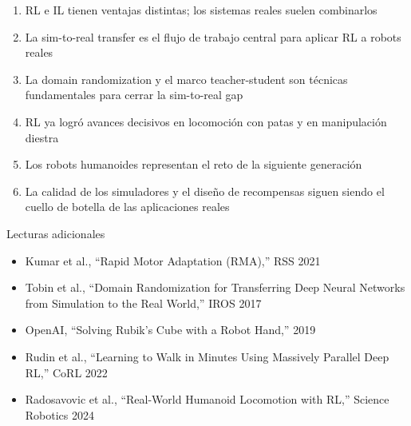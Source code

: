 \documentclass[a4paper]{article}
\begin{document}
\begin{enumerate}
    \item RL e IL tienen ventajas distintas; los sistemas reales suelen combinarlos
    \item La sim-to-real transfer es el flujo de trabajo central para aplicar RL a robots reales
    \item La domain randomization y el marco teacher-student son técnicas fundamentales para cerrar la sim-to-real gap
    \item RL ya logró avances decisivos en locomoción con patas y en manipulación diestra
    \item Los robots humanoides representan el reto de la siguiente generación
    \item La calidad de los simuladores y el diseño de recompensas siguen siendo el cuello de botella de las aplicaciones reales
\end{enumerate}

\begin{knowledgebox}{Lecturas adicionales}
\begin{itemize}
    \item Kumar et al., ``Rapid Motor Adaptation (RMA),'' RSS 2021
    \item Tobin et al., ``Domain Randomization for Transferring Deep Neural Networks from Simulation to the Real World,'' IROS 2017
    \item OpenAI, ``Solving Rubik's Cube with a Robot Hand,'' 2019
    \item Rudin et al., ``Learning to Walk in Minutes Using Massively Parallel Deep RL,'' CoRL 2022
    \item Radosavovic et al., ``Real-World Humanoid Locomotion with RL,'' Science Robotics 2024
\end{itemize}
\end{knowledgebox}
\end{document}
